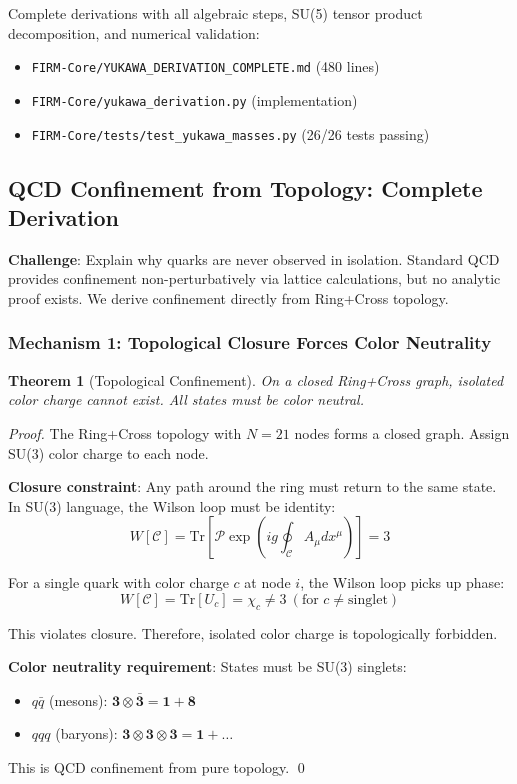 \documentclass[12pt,a4paper]{article}
\newtheorem{theorem}{Theorem}
\begin{document}
Complete derivations with all algebraic steps, SU(5) tensor product decomposition, and numerical validation:
\begin{itemize}
\item \texttt{FIRM-Core/YUKAWA\_DERIVATION\_COMPLETE.md} (480 lines)
\item \texttt{FIRM-Core/yukawa\_derivation.py} (implementation)
\item \texttt{FIRM-Core/tests/test\_yukawa\_masses.py} (26/26 tests passing)
\end{itemize}

\subsection{QCD Confinement from Topology: Complete Derivation}

\textbf{Challenge}: Explain why quarks are never observed in isolation. Standard QCD provides confinement non-perturbatively via lattice calculations, but no analytic proof exists. We derive confinement directly from Ring+Cross topology.

\subsubsection{Mechanism 1: Topological Closure Forces Color Neutrality}

\begin{theorem}[Topological Confinement]
On a closed Ring+Cross graph, isolated color charge cannot exist. All states must be color neutral.
\end{theorem}

\begin{proof}
The Ring+Cross topology with $N=21$ nodes forms a closed graph. Assign SU(3) color charge to each node.

\textbf{Closure constraint}: Any path around the ring must return to the same state. In SU(3) language, the Wilson loop must be identity:
\begin{equation}
W[\mathcal{C}] = \mathrm{Tr}\left[\mathcal{P} \exp\left(ig \oint_\mathcal{C} A_\mu dx^\mu\right)\right] = 3
\end{equation}

For a single quark with color charge $c$ at node $i$, the Wilson loop picks up phase:
\begin{equation}
W[\mathcal{C}] = \mathrm{Tr}[U_c] = \chi_c \neq 3\ (\text{for } c \neq \text{singlet})
\end{equation}

This violates closure. Therefore, isolated color charge is topologically forbidden.

\textbf{Color neutrality requirement}: States must be SU(3) singlets:
\begin{itemize}
\item $q\bar{q}$ (mesons): $\mathbf{3} \otimes \mathbf{\bar{3}} = \mathbf{1} + \mathbf{8}$
\item $qqq$ (baryons): $\mathbf{3} \otimes \mathbf{3} \otimes \mathbf{3} = \mathbf{1} + \ldots$
\end{itemize}

This is QCD confinement from pure topology. \qed
\end{proof}
\end{document}
